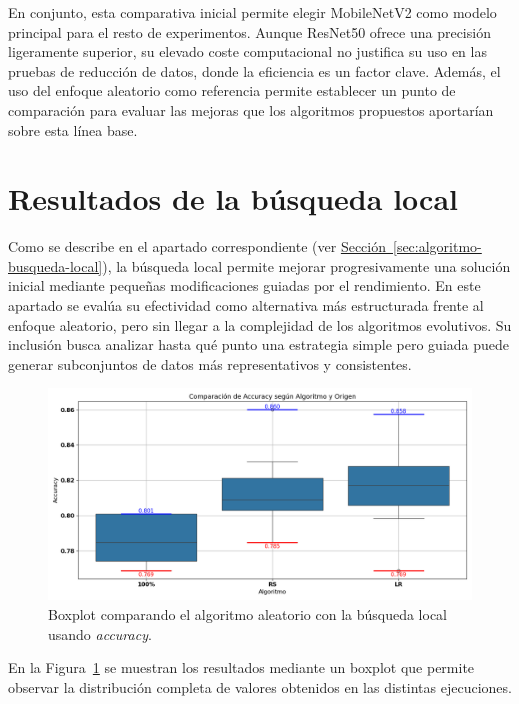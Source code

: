 En conjunto, esta comparativa inicial permite elegir MobileNetV2 como modelo principal para el resto de experimentos.
Aunque ResNet50 ofrece una precisión ligeramente superior, su elevado coste computacional no justifica su uso en las pruebas de reducción de datos,
donde la eficiencia es un factor clave.
Además, el uso del enfoque aleatorio como referencia permite establecer un punto de comparación para evaluar las mejoras que los algoritmos propuestos aportarían sobre esta línea base.


\section{Resultados de la búsqueda local}\label{sec:resultados-busqueda-local}
Como se describe en el apartado correspondiente (ver \hyperref[sec:algoritmo-busqueda-local]{Sección~\ref*{sec:algoritmo-busqueda-local}}),
la búsqueda local permite mejorar progresivamente una solución inicial mediante pequeñas modificaciones guiadas por el rendimiento.
En este apartado se evalúa su efectividad como alternativa más estructurada frente al enfoque aleatorio, pero sin llegar a la complejidad de los algoritmos evolutivos.
Su inclusión busca analizar hasta qué punto una estrategia simple pero guiada puede generar subconjuntos de datos más representativos y consistentes.

\begin{figure}[htp]
    \centering
    \includegraphics[width=1\textwidth]{imagenes/evaluaciones/comparacion_aleatorio-bl}
    \caption{Boxplot comparando el algoritmo aleatorio con la búsqueda local usando \textit{accuracy}.}
    \label{fig:aleatorio-vs-busqueda-local}
\end{figure}

En la Figura~\ref{fig:aleatorio-vs-busqueda-local} se muestran los resultados mediante un boxplot que permite observar
la distribución completa de valores obtenidos en las distintas ejecuciones.

